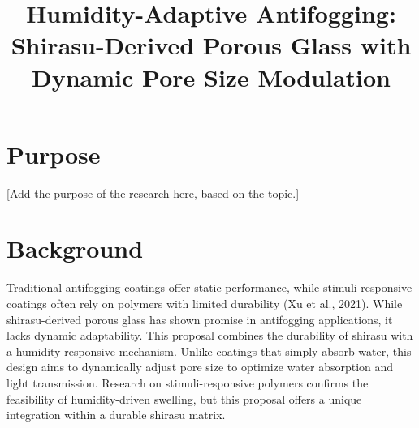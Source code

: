 \documentclass{article}
\title{Humidity-Adaptive Antifogging: Shirasu-Derived Porous Glass with Dynamic Pore Size Modulation}
\author{}
\date{}
\begin{document}
\maketitle
\section{Purpose}
[Add the purpose of the research here, based on the topic.]

\section{Background}
Traditional antifogging coatings offer static performance, while stimuli-responsive coatings often rely on polymers with limited durability (Xu et al., 2021). While shirasu-derived porous glass has shown promise in antifogging applications, it lacks dynamic adaptability. This proposal combines the durability of shirasu with a humidity-responsive mechanism. Unlike coatings that simply absorb water, this design aims to dynamically adjust pore size to optimize water absorption and light transmission. Research on stimuli-responsive polymers confirms the feasibility of humidity-driven swelling, but this proposal offers a unique integration within a durable shirasu matrix.
\end{document}
